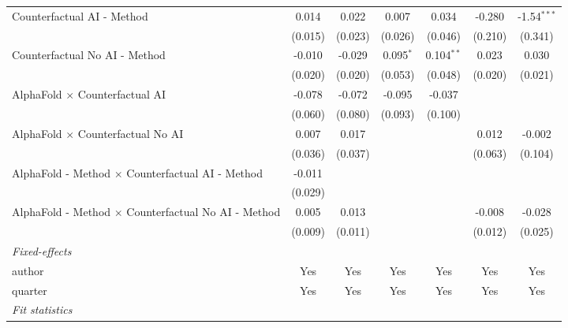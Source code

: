 \begin{tabular}{lcccccc}
   Counterfactual AI - Method                                 & 0.014   & 0.022   & 0.007         & 0.034         & -0.280  & -1.54$^{***}$\\   
                                                              & (0.015) & (0.023) & (0.026)       & (0.046)       & (0.210) & (0.341)\\   
   Counterfactual No AI - Method                              & -0.010  & -0.029  & 0.095$^{*}$   & 0.104$^{**}$  & 0.023   & 0.030\\   
                                                              & (0.020) & (0.020) & (0.053)       & (0.048)       & (0.020) & (0.021)\\   
   AlphaFold $\times$ Counterfactual AI                       & -0.078  & -0.072  & -0.095        & -0.037        &         &   \\   
                                                              & (0.060) & (0.080) & (0.093)       & (0.100)       &         &   \\   
   AlphaFold $\times$ Counterfactual No AI                    & 0.007   & 0.017   &               &               & 0.012   & -0.002\\   
                                                              & (0.036) & (0.037) &               &               & (0.063) & (0.104)\\   
   AlphaFold - Method $\times$ Counterfactual AI - Method     & -0.011  &         &               &               &         &   \\   
                                                              & (0.029) &         &               &               &         &   \\   
   AlphaFold - Method $\times$ Counterfactual No AI - Method  & 0.005   & 0.013   &               &               & -0.008  & -0.028\\   
                                                              & (0.009) & (0.011) &               &               & (0.012) & (0.025)\\   
   \midrule
   \emph{Fixed-effects}\\
   author                                                     & Yes     & Yes     & Yes           & Yes           & Yes     & Yes\\  
   quarter                                                    & Yes     & Yes     & Yes           & Yes           & Yes     & Yes\\  
   \midrule
   \emph{Fit statistics}\\

\end{tabular}
